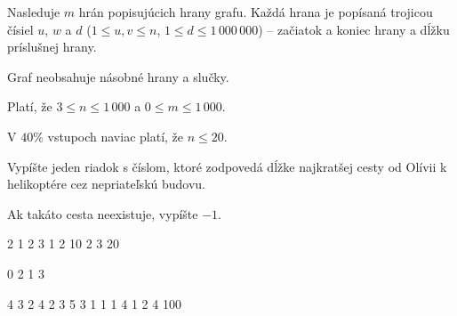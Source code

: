Nasleduje $m$ hrán popisujúcich hrany grafu. Každá hrana je popísaná trojicou čísiel $u$, $w$ a $d$
($1 \leq u,v \leq n$, $1 \leq d \leq 1\,000\,000$) -- začiatok a koniec hrany a dĺžku príslušnej
hrany.

Graf neobsahuje násobné hrany a slučky.

\smallskip
Platí, že $3 \leq n \leq 1\,000$ a $0 \leq m \leq 1\,000$.

V $40\%$ vstupoch naviac platí, že $n\leq 20$.


Vypíšte jeden riadok s číslom, ktoré zodpovedá dĺžke najkratšej cesty od Olívii k helikoptére cez
nepriateľskú budovu.

Ak takáto cesta neexistuje, vypíšte $-1$.



 2 1 2 3
1 2 10
2 3 20
\sampleEND


\bigskip


 0 2 1 3
\sampleEND


\bigskip


 4 3 2 4
2 3 5
3 1 1
1 4 1
2 4 100
\sampleEND


